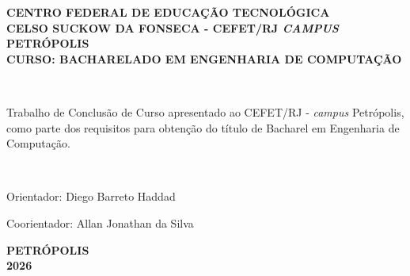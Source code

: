 \begin{center}
{\large \bf CENTRO FEDERAL DE EDUCAÇÃO TECNOLÓGICA} \vspace{1mm} \\
{\large \bf CELSO SUCKOW DA FONSECA - CEFET/RJ \textit{CAMPUS} PETRÓPOLIS} \vspace{1mm} \\
{\large \bf CURSO: BACHARELADO EM ENGENHARIA DE COMPUTAÇÃO}

\vspace*{3cm}
\normalsize{\large \bf {}}\\
\end{center}
\vspace{1.5cm}
\hfill
	\begin{flushright}
	\end{flushright}
\vspace*{1.5cm}
\begin{flushright}
	\begin{minipage}{0.5\textwidth}
		{\normalsize
		Trabalho de Conclusão de Curso apresentado ao  
	 CEFET/RJ - {\it campus} Petrópolis, como parte dos requisitos para obtenção do título de Bacharel em Engenharia de Computação.}
	\end{minipage}\\[1.5cm]
\end{flushright}
\vspace{1.5cm}
\hfill
\begin{flushright}
Orientador: Diego Barreto Haddad

Coorientador: Allan Jonathan da Silva 
\end{flushright}




\vspace*{3.3cm}
\begin{center}
{\bfseries PETRÓPOLIS \\ 2026}\\
\end{center}



